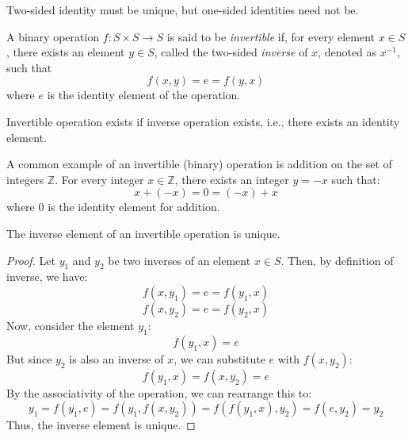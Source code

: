 \documentclass[11pt,fleqn]{book} %
\begin{document}
\begin{remark}
    Two-sided identity must be unique, but one-sided identities need not be.
\end{remark}

\begin{example}
    
\end{example}

\begin{definition}
    A binary operation $f: S \times S \to S$ is said to be \emph{invertible} if, for every element $x \in S$, there exists an element $y \in S$, called the two-sided \emph{inverse} of $x$, denoted as $x^{-1}$, such that
    \[ f(x,y) = e = f(y,x) \]
    where $e$ is the identity element of the operation.
\end{definition}

\begin{remark}
    Invertible operation exists if inverse operation exists, i.e., there exists an identity element.
\end{remark}

\begin{example}
    A common example of an invertible (binary) operation is addition on the set of integers $\mathbb{Z}$. For every integer $x \in \mathbb{Z}$, there exists an integer $y = -x$ such that:
    \begin{equation}
        x + (-x) = 0 = (-x) + x
    \end{equation}
    where $0$ is the identity element for addition.
\end{example}

\begin{proposition}
    The inverse element of an invertible operation is unique.
\end{proposition}

\begin{proof}
    Let $y_1$ and $y_2$ be two inverses of an element $x \in S$. Then, by definition of inverse, we have:
    \[ f(x,y_1) = e = f(y_1,x) \]
    \[ f(x,y_2) = e = f(y_2,x) \]
    Now, consider the element $y_1$:
    \[ f(y_1,x) = e \]
    But since $y_2$ is also an inverse of $x$, we can substitute $e$ with $f(x,y_2)$:
    \[ f(y_1,x) = f(x,y_2) = e \]
    By the associativity of the operation, we can rearrange this to:
    \[ y_1 = f(y_1, e) = f(y_1,f(x,y_2)) = f(f(y_1,x),y_2) = f(e,y_2) = y_2 \]
    Thus, the inverse element is unique.
\end{proof}
\end{document}
